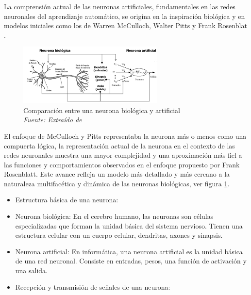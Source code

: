 La comprensión actual de las neuronas artificiales, fundamentales en las redes neuronales del aprendizaje automático, se origina en la inspiración biológica y en modelos iniciales como los de Warren McCulloch, Walter Pitts y Frank Rosenblat . 

\begin{figure}[h!]
	\centering
	\includegraphics[width=0.65\textwidth]{capitulo2/figuras/an5.png}
	\caption[Comparación entre una neurona biológica y  artificial]{Comparación entre una neurona biológica y  artificial
		\\\textit{Fuente: Extraído de} \protect\cite[p. 4]{lao2017procedimiento}}
	\label{fig:an5}

\end{figure}


El enfoque de McCulloch y Pitts representaba la neurona más  o menos como una compuerta lógica, la representación actual de la neurona en el contexto de las redes neuronales muestra una mayor complejidad y una aproximación más fiel a las funciones y comportamientos observados en el enfoque propuesto por Frank Rosenblatt. Este avance refleja un modelo más detallado y más cercano a la naturaleza multifacética y dinámica de las neuronas biológicas, ver figura \ref{fig:an5}.

\begin{itemize}
\item Estructura básica de una neurona:
\end{itemize}

\begin{itemize}
	\item	 Neurona biológica: En el cerebro humano, las neuronas son células especializadas que forman la unidad básica del sistema nervioso. Tienen una estructura celular con un cuerpo celular, dendritas, axones y sinapsis.
	\item	Neurona artificial: En informática, una neurona artificial es la unidad básica de una red neuronal. Consiste en entradas, pesos, una función de activación y una salida.
\end{itemize}

\begin{itemize}
\item Recepción y transmisión de señales de una neurona:
\end{itemize}


